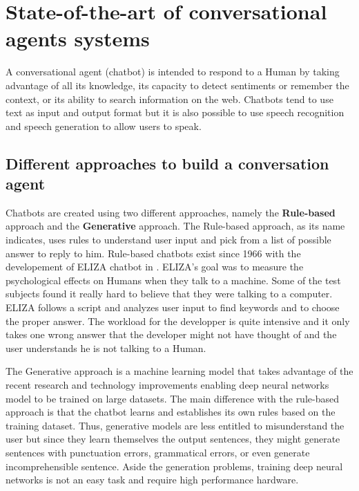 
\chapter{State-of-the-art of conversational agents systems} %

\label{Chapter2} %

A conversational agent (chatbot) is intended to respond to a Human by taking advantage of all its knowledge, its capacity to detect sentiments or remember the context, or its ability to search information on the web. Chatbots tend to use text as input and output format but it is also possible to use speech recognition and speech generation to allow users to speak.

\section{Different approaches to build a conversation agent}
Chatbots are created using two different approaches, namely the \textbf{Rule-based} approach and the \textbf{Generative} approach. The Rule-based approach, as its name indicates, uses rules to understand user input and pick from a list of possible answer to reply to him. Rule-based chatbots exist since 1966 with the developement of ELIZA chatbot in \cite{Weizenbaum:1966:ECP:365153.365168}. ELIZA's goal was to measure the psychological effects on Humans when they talk to a machine. Some of the test subjects found it really hard to believe that they were talking to a computer. ELIZA follows a script and analyzes user input to find keywords and to choose the proper answer. The workload for the developper is quite intensive and it only takes one wrong answer that the developer might not have thought of and the user understands he is not talking to a Human.

The Generative approach is a machine learning model that takes advantage of the recent research and technology improvements enabling deep neural networks model to be trained on large datasets. The main difference with the rule-based approach is that the chatbot learns and establishes its own rules based on the training dataset. Thus, generative models are less entitled to misunderstand the user but since they learn themselves the output sentences, they might generate sentences with punctuation errors, grammatical errors, or even generate incomprehensible sentence. Aside the generation problems, training deep neural networks is not an easy task and require high performance hardware.

